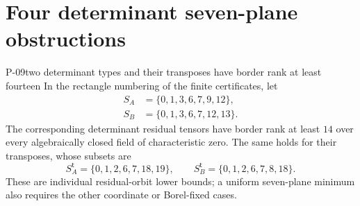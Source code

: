 
\section{Four determinant seven-plane obstructions}

\begin{finding}{P-09}{two determinant types and their transposes have border rank at least fourteen}
In the rectangle numbering of the finite certificates, let
\[
 \begin{split}
 S_A&=\{0,1,3,6,7,9,12\},\\
 S_B&=\{0,1,3,6,7,12,13\}.
 \end{split}
\]
The corresponding determinant residual tensors have border
rank at least \(14\) over every algebraically closed field
of characteristic zero. The same holds for their transposes,
whose subsets are
\[
 S_A^{\mathsf t}=\{0,1,2,6,7,18,19\},\qquad
 S_B^{\mathsf t}=\{0,1,2,6,7,8,18\}.
\]
These are individual residual-orbit lower bounds; a uniform
seven-plane minimum also requires the other coordinate or
Borel-fixed cases.
\end{finding}
